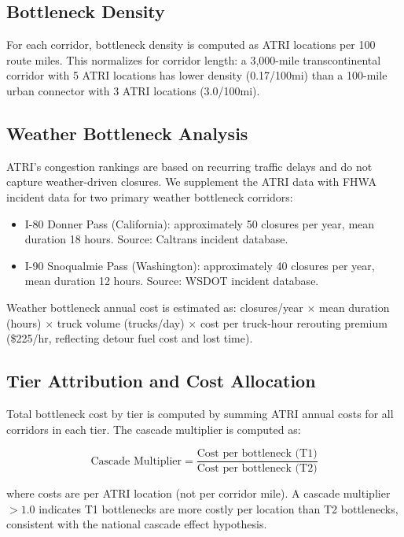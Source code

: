 \subsection{Bottleneck Density}

For each corridor, bottleneck density is computed as ATRI locations per 100 route miles. This normalizes for corridor length: a 3,000-mile transcontinental corridor with 5 ATRI locations has lower density (0.17/100mi) than a 100-mile urban connector with 3 ATRI locations (3.0/100mi).

\subsection{Weather Bottleneck Analysis}

ATRI's congestion rankings are based on recurring traffic delays and do not capture weather-driven closures. We supplement the ATRI data with FHWA incident data for two primary weather bottleneck corridors:

\begin{itemize}
\item I-80 Donner Pass (California): approximately 50 closures per year, mean duration 18 hours. Source: Caltrans incident database.
\item I-90 Snoqualmie Pass (Washington): approximately 40 closures per year, mean duration 12 hours. Source: WSDOT incident database.
\end{itemize}

Weather bottleneck annual cost is estimated as: closures/year $\times$ mean duration (hours) $\times$ truck volume (trucks/day) $\times$ cost per truck-hour rerouting premium (\$225/hr, reflecting detour fuel cost and lost time).

\subsection{Tier Attribution and Cost Allocation}

Total bottleneck cost by tier is computed by summing ATRI annual costs for all corridors in each tier. The cascade multiplier is computed as:

\begin{equation}
\text{Cascade Multiplier} = \frac{\text{Cost per bottleneck (T1)}}{\text{Cost per bottleneck (T2)}}
\end{equation}

where costs are per ATRI location (not per corridor mile). A cascade multiplier $> 1.0$ indicates T1 bottlenecks are more costly per location than T2 bottlenecks, consistent with the national cascade effect hypothesis.

